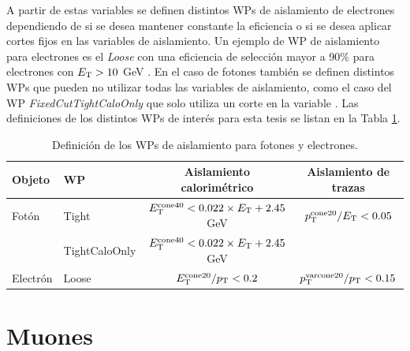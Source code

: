 
A partir de estas variables se definen distintos WPs de aislamiento de electrones dependiendo de si se desea mantener constante la eficiencia o si se desea aplicar cortes fijos en las variables de aislamiento. Un ejemplo de WP de aislamiento para electrones es el \textit{Loose} con una eficiencia de selección mayor a 90\% para electrones con $E_{\text{T}}>10$ GeV \cite{EGAM-2018-01}. En el caso de fotones también se definen distintos WPs que pueden no utilizar todas las variables de aislamiento, como el caso del WP \textit{FixedCutTightCaloOnly} que solo utiliza un corte en la variable \ETcone. Las definiciones de los distintos WPs de interés para esta tesis se listan en la Tabla \ref{IDWPs}.



\begin{table} 
\centering
\caption{Definición de los WPs de aislamiento para fotones y electrones.
}
	\begin{tabular}{ l l c c}

		Objeto & WP & Aislamiento calorimétrico & Aislamiento de trazas \\

		\hline
		\hline

		Fotón & Tight & $E_{\text{T}}^{\text{cone40}} < 0.022\times E_{\text{T}} + 2.45$ GeV & $p_{\text{T}}^{\text{cone20}}/E_{\text{T}}<0.05$ \\

		 & TightCaloOnly & $E_{\text{T}}^{\text{cone40}} < 0.022\times E_{\text{T}} + 2.45$ GeV &  \\

		\hline

		Electrón & Loose & $E_{\text{T}}^{\text{cone20}}/p_{\text{T}}<0.2$ & $p_{\text{T}}^{\text{varcone20}}/p_{\text{T}}<0.15$\\

	\end{tabular}
\label{IDWPs}
\end{table}








\section{Muones}


